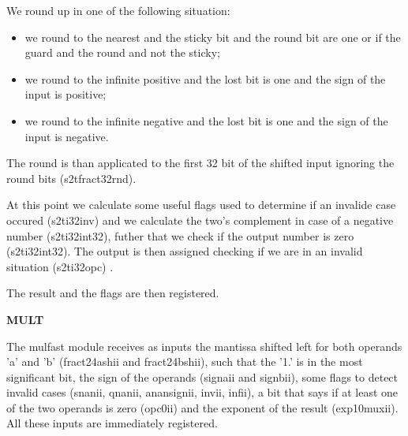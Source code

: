 We round up in one of the following situation:
\begin{itemize}
\item we round to the nearest and the sticky bit and the round bit are one or if the guard and the round and not the sticky;
\item we round to the infinite positive and the lost bit is one and the sign of the input is positive;
\item we round to the infinite negative and the lost bit is one and the sign of the input is negative.
\end{itemize}
The round is than applicated to the first 32 bit of the shifted input ignoring the round bits (s2t\textunderscore fract32\textunderscore rnd).

At this point we calculate some useful flags used to determine if an invalide case occured (s2t\textunderscore i32\textunderscore inv) and we calculate the two's complement in case of a negative number (s2t\textunderscore i32\textunderscore int32), futher that we check if the output number is zero (s2t\textunderscore i32\textunderscore int32).
The output is then assigned checking if we are in an invalid situation (s2t\textunderscore i32\textunderscore opc) .

The result and the flags are then registered.
\newline

\textbf{MULT}
\newline

The mul\textunderscore fast module receives as inputs the mantissa shifted left for both operands 'a' and 'b' (fract24ash\textunderscore ii and fract24bsh\textunderscore ii), such that the '1.' is in the most significant bit, the sign of the operands (signa\textunderscore ii and signb\textunderscore ii), some flags to detect invalid cases (snan\textunderscore ii, qnan\textunderscore ii, anan\textunderscore sign\textunderscore ii, inv\textunderscore ii, inf\textunderscore ii), a bit that says if at least one of the two operands is zero (opc0\textunderscore ii) and the exponent of the result (exp10mux\textunderscore ii). All these inputs are immediately registered.

